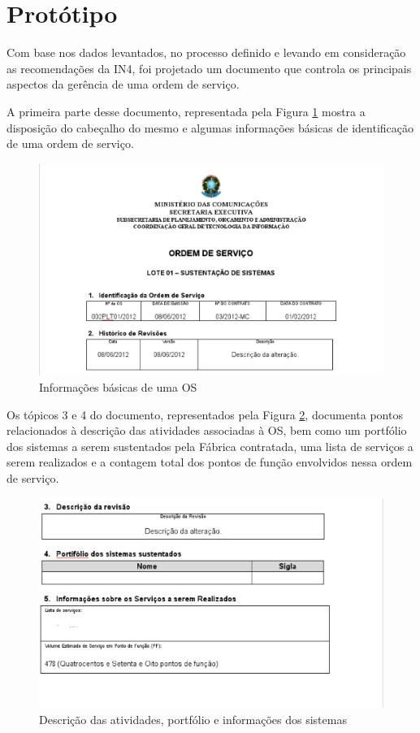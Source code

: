 \section{Protótipo}

Com base nos dados levantados, no processo definido e levando em consideração
as recomendações da IN4, foi projetado um documento que controla os principais
aspectos da gerência de uma ordem de serviço.

A primeira parte desse documento, representada pela Figura \ref{fig:cabecalho_1_2}
mostra a disposição do cabeçalho do mesmo e algumas informações básicas de 
identificação de uma ordem de serviço.

\begin{figure}[H]
  \centering
  \includegraphics[keepaspectratio=true,scale=0.5]{figures/cabecalho_1_2}
  \caption{Informações básicas de uma OS \label{fig:cabecalho_1_2}}
\end{figure}

Os tópicos 3 e 4 do documento, representados pela Figura \ref{fig:pt3_4_5}, documenta
pontos relacionados à descrição das atividades associadas à OS, bem como um portfólio
dos sistemas a serem sustentados pela Fábrica contratada, uma lista de serviços a serem
realizados e a contagem total dos pontos de função envolvidos nessa ordem de serviço.

\begin{figure}[H]
  \centering
  \includegraphics[keepaspectratio=true,scale=0.5]{figures/pt3_4_5}
  \caption{Descrição das atividades, portfólio e informações dos sistemas \label{fig:pt3_4_5}}
\end{figure}

